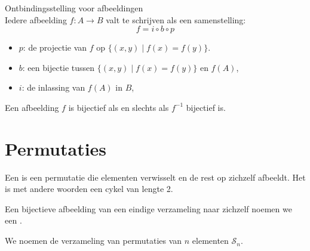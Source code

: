 \documentclass[main.tex]{subfiles}
\begin{document}
\begin{st}
  Ontbindingsstelling voor afbeeldingen\\
  Iedere afbeelding $f:A\rightarrow B$ valt te schrijven als een samenstelling:
  \[ f = i \circ b \circ p \]
  \begin{itemize}
  \item $p$: de projectie van $f$ op $\{ (x,y) \mid f(x) = f(y) \}$.
  \item $b$: een bijectie tussen $\{ (x,y) \mid f(x) = f(y) \}$ en $f(A)$,
  \item $i$: de inlassing van $f(A)$ in $B$,
  \end{itemize}
  \begin{figure}[H]
    \centering
  \end{figure}
\end{st}

\begin{st}
  \label{st:f-bijec-asa-f-1-bijec}
  Een afbeelding $f$ is bijectief als en slechts als $f^{-1}$ bijectief is.
\end{st}

\section{Permutaties}
\label{sec:permutaties}

\begin{de}
  Een  is een permutatie die elementen verwisselt en de rest op zichzelf afbeeldt.
  Het is met andere woorden een cykel van lengte 2.
\end{de}

\begin{de}
  Een bijectieve afbeelding van een eindige verzameling naar zichzelf noemen we een .
\end{de}

\begin{de}
  We noemen de verzameling van permutaties van $n$ elementen $\mathcal{S}_{n}$.
\end{de}
\end{document}
